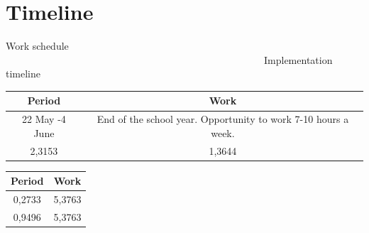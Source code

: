 \documentclass[]{article}
\begin{document}
\section{Timeline}
Work schedule ~~~~~~~~~~~~~~~~~~~~~~~~~~~~~~~~~~~~~~~~~~~~~~~~~~~~Implementation timeline
	\begin{table}[h]
		\begin{minipage}{.4\textwidth}
			\centering
			\begin{tabular}{|c|c|}
				\hline
				 Period & Work\\
				\hline 22 May -4 June  & End of the school year. Opportunity to work 7-10 hours a week.
				\\
				2,3153 & 1,3644\\
				\hline
			\end{tabular}
		\end{minipage}
		\begin{minipage}{.4\textwidth}
			\centering
			\begin{tabular}{|c|c|}
				\hline Period  & Work\\
				\hline 0,2733 & 5,3763\\
				0,9496 & 5,3763\\
				\hline
			\end{tabular}
		\end{minipage}
	\end{table}
	



\end{document}

